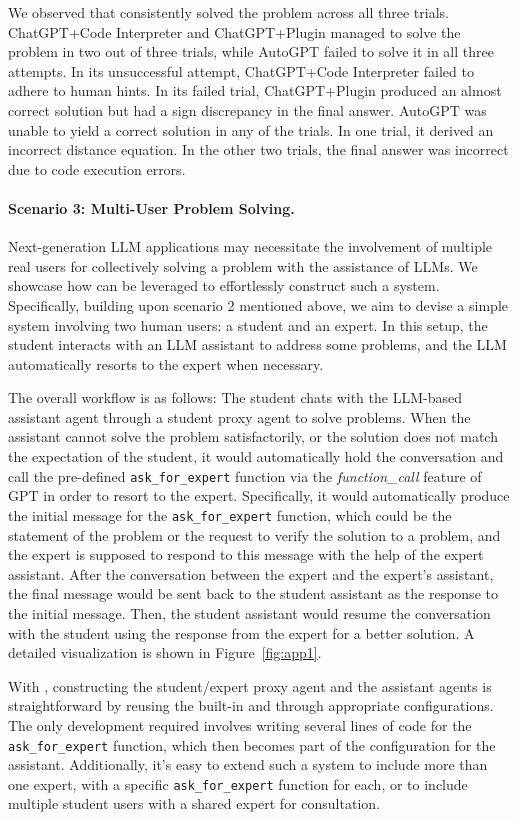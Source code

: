 We observed that \libName consistently solved the problem across all three trials. ChatGPT+Code Interpreter and ChatGPT+Plugin managed to solve the problem in two out of three trials, while AutoGPT failed to solve it in all three attempts. In its unsuccessful attempt, ChatGPT+Code Interpreter failed to adhere to human hints. In its failed trial, ChatGPT+Plugin produced an almost correct solution but had a sign discrepancy in the final answer. AutoGPT was unable to yield a correct solution in any of the trials. In one trial, it derived an incorrect distance equation. In the other two trials, the final answer was incorrect due to code execution errors.


\paragraph{Scenario 3:  Multi-User Problem Solving.}

Next-generation LLM applications may necessitate the involvement of multiple real users for collectively solving a problem with the assistance of LLMs. We showcase how \libName can be leveraged to effortlessly construct such a system. Specifically, building upon scenario 2 mentioned above, we aim to devise a simple system involving two human users: a student and an expert. In this setup, the student interacts with an LLM assistant to address some problems, and the LLM automatically resorts to the expert when necessary.

The overall workflow is as follows: The student chats with the LLM-based assistant agent through a student proxy agent to solve problems. 
When the assistant cannot solve the problem satisfactorily, or the solution does not match the expectation of the student, it would automatically hold the conversation and call the pre-defined \texttt{ask\_for\_expert} function via the \textit{function\_call} feature of GPT in order to resort to the expert. Specifically, it would automatically produce the initial message for the \texttt{ask\_for\_expert} function, which could be the statement of the problem or the request to verify the solution to a problem, and the expert is supposed to respond to this message with the help of the expert assistant. After the conversation between the expert and the expert's assistant, the final message would be sent back to the student assistant as the response to the initial message. Then, the student assistant would resume the conversation with the student using the response from the expert for a better solution.  A detailed visualization is shown in Figure~\ref{fig:app1}.

With \libName, constructing the student/expert proxy agent and the assistant agents is straightforward by reusing the built-in \UserProxyAgent and \AssistantAgent through appropriate configurations. The only development required involves writing several lines of code for the \texttt{ask\_for\_expert} function, which then becomes part of the configuration for the assistant. Additionally, it's easy to extend such a system to include more than one expert, with a specific \texttt{ask\_for\_expert} function for each, or to include multiple student users with a shared expert for consultation.

